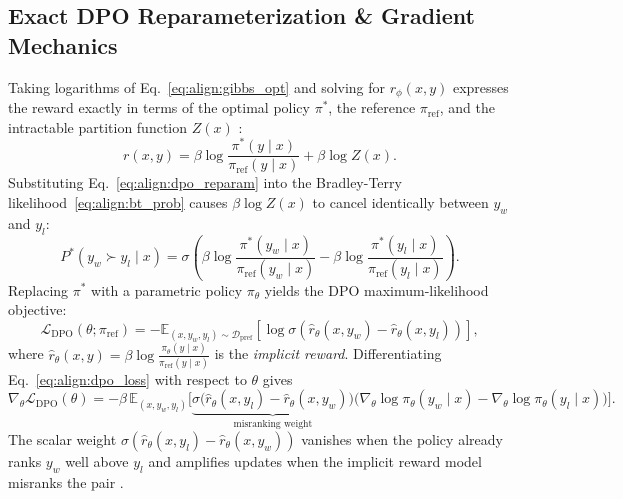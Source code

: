\documentclass[../../../../master.tex]{subfiles}
\begin{document}
\subsection{Exact DPO Reparameterization \& Gradient Mechanics}

\begin{coremath}
Taking logarithms of Eq.~\eqref{eq:align:gibbs_opt} and solving for $r_\phi(x,y)$ expresses the reward exactly in terms of the optimal policy $\pi^*$, the reference $\pi_{\mathrm{ref}}$, and the intractable partition function $Z(x)$  :
\begin{equation}
\label{eq:align:dpo_reparam}
r(x,y) = \beta \log \frac{\pi^*(y \mid x)}{\pi_{\mathrm{ref}}(y \mid x)} + \beta \log Z(x).
\end{equation}
Substituting Eq.~\eqref{eq:align:dpo_reparam} into the Bradley-Terry likelihood~\eqref{eq:align:bt_prob} causes $\beta \log Z(x)$ to cancel identically between $y_w$ and $y_l$:
\begin{equation}
\label{eq:align:dpo_bt}
P^*(y_w \succ y_l \mid x) = \sigma\!\left( \beta \log \frac{\pi^*(y_w \mid x)}{\pi_{\mathrm{ref}}(y_w \mid x)} - \beta \log \frac{\pi^*(y_l \mid x)}{\pi_{\mathrm{ref}}(y_l \mid x)} \right).
\end{equation}
Replacing $\pi^*$ with a parametric policy $\pi_\theta$ yields the DPO maximum-likelihood objective:
\begin{equation}
\label{eq:align:dpo_loss}
\mathcal{L}_{\mathrm{DPO}}(\theta; \pi_{\mathrm{ref}}) = -\mathbb{E}_{(x, y_w, y_l) \sim \mathcal{D}_{\mathrm{pref}}} \!\left[ \log \sigma\!\left( \hat{r}_\theta(x, y_w) - \hat{r}_\theta(x, y_l) \right) \right],
\end{equation}
where $\hat{r}_\theta(x,y) = \beta \log \frac{\pi_\theta(y \mid x)}{\pi_{\mathrm{ref}}(y \mid x)}$ is the \emph{implicit reward}. Differentiating Eq.~\eqref{eq:align:dpo_loss} with respect to $\theta$ gives
\begin{equation}
\label{eq:align:dpo_grad}
\nabla_\theta \mathcal{L}_{\mathrm{DPO}}(\theta) = -\beta\,\mathbb{E}_{(x, y_w, y_l)} \Big[ \underbrace{\sigma\!\big(\hat{r}_\theta(x, y_l) - \hat{r}_\theta(x, y_w)\big)}_{\text{misranking weight}} \big( \nabla_\theta \log \pi_\theta(y_w \mid x) - \nabla_\theta \log \pi_\theta(y_l \mid x) \big) \Big].
\end{equation}
The scalar weight $\sigma(\hat{r}_\theta(x,y_l) - \hat{r}_\theta(x,y_w))$ vanishes when the policy already ranks $y_w$ well above $y_l$ and amplifies updates when the implicit reward model misranks the pair .
\end{coremath}
\end{document}
